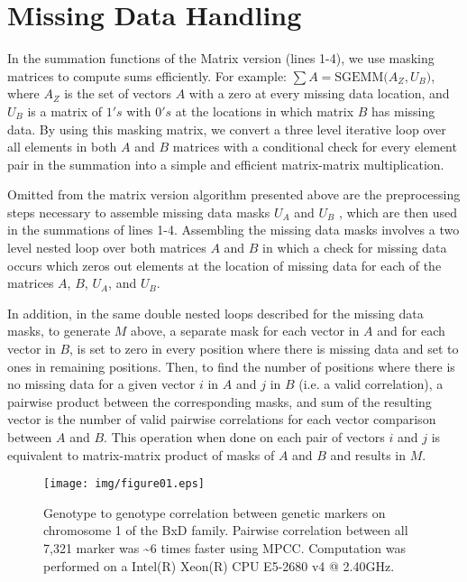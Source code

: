 \documentclass{bioinfo}
\begin{document}
\section{Missing Data Handling} \label{MDBM}
In the summation functions of the Matrix version (lines 1-4), we use masking matrices to compute 
sums efficiently. For example: $\sum A=\text{SGEMM(}A_Z,U_B\text{)}$, where $A_Z$ is the set of 
vectors $A$ with a zero at every missing data location, and $U_B$ is a matrix of $1's$ with $0's$ 
at the locations in which matrix $B$ has missing data. By using this masking matrix, we convert a 
three level iterative loop over all elements in both $A$ and $B$ matrices with a conditional check 
for every element pair in the summation into a simple and efficient matrix-matrix multiplication.

Omitted from the matrix version algorithm presented above are the preprocessing steps necessary to 
assemble missing data masks $U_A$ and $U_B$ , which are then used in the summations of lines 1-4.
Assembling the missing data masks involves a two level nested loop over both matrices $A$ and $B$ in 
which a check for missing data occurs which zeros out elements at the location of missing data for 
each of the matrices $A$, $B$, $U_A$, and $U_B$.

In addition, in the same double nested loops described for the missing data masks, to 
generate $M$ above, a separate mask for each vector in $A$ and for each vector in $B$, 
is set to zero in every position where there is missing data and set to ones in remaining positions.
Then, to find the number of positions where there is no missing data for a given vector $i$ 
in $A$ and $j$ in $B$ (i.e. a valid correlation), a pairwise product between the corresponding masks, 
and sum of the resulting vector is the number of valid
pairwise correlations for each vector comparison between $A$ and $B$. This operation when done 
on each pair of vectors $i$ and $j$ is equivalent to matrix-matrix product of masks of 
$A$ and $B$ and results in $M$.

\begin{figure}[H]
\centering
\texttt{[image: img/figure01.eps]}
  \caption*{ \small Genotype to genotype correlation between genetic markers on chromosome 
    1 of the BxD family. Pairwise correlation between all 7,321 marker was \textasciitilde{}6 times 
    faster using MPCC. Computation was performed on a Intel(R) Xeon(R) CPU E5-2680 v4 @ 2.40GHz.  }
\end{figure}
\end{document}
